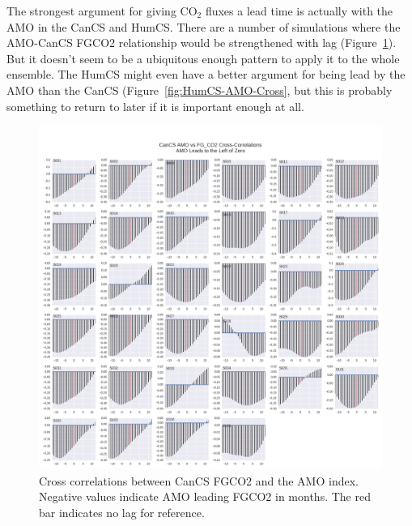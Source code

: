 \documentclass[12pt]{article}
\begin{document}
The strongest argument for giving CO$_{2}$ fluxes a lead time is actually with the AMO in the CanCS and HumCS. There are a number of simulations where the AMO-CanCS FGCO2 relationship would be strengthened with lag (Figure~\ref{fig:CanCS-AMO-Cross}). But it doesn't seem to be a ubiquitous enough pattern to apply it to the whole ensemble. The HumCS might even have a better argument for being lead by the AMO than the CanCS (Figure~\ref{fig:HumCS-AMO-Cross}, but this is probably something to return to later if it is important enough at all.

\newpage
\begin{figure}[!h]
	\centering
	\includegraphics[width=\linewidth]{../../figs/cancs/cross-correlation/AMO_FGCO2_cross-correlation_CanCS_bothSmoothed.png}
	\caption{Cross correlations between CanCS FGCO2 and the AMO index. Negative values indicate AMO leading FGCO2 in months. The red bar indicates no lag for reference.}
	\label{fig:CanCS-AMO-Cross}
\end{figure}
\newpage
\end{document}
